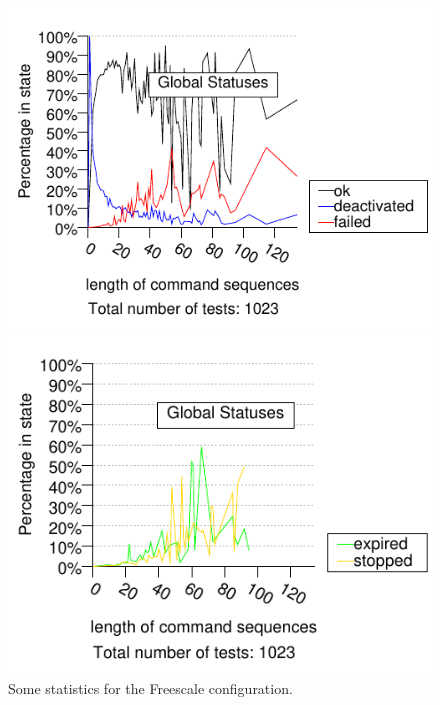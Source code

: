 \begin{figure}[!ht]
{    \label{FIG:STATUSES_FREESCALE}
    \begin{minipage}{0.48\linewidth}
      \includegraphics[keepaspectratio, width=\linewidth ]{generated_pictures/history_statuses_freescale_recoverable.pdf}
    \end{minipage}
    \begin{minipage}{0.48\linewidth}
      \includegraphics[keepaspectratio, width=\linewidth ]{generated_pictures/history_statuses_freescale_nonrecoverable.pdf}
    \end{minipage}
  }
  \caption{Some statistics for the Freescale configuration.}
  \label{FIG:FREESCALE}
\end{figure}

